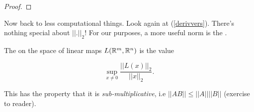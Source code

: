 \documentclass[11pt]{scrartcl}
\begin{document}
\begin{theorem}
\begin{proof}
\end{proof}
\end{theorem}

Now back to less computational things. Look again at (\ref{derivvers}). There's nothing special about $||.||_2$! For our purposes, a more useful norm is the .

\begin{definition}

The  on the space of linear maps $L(\mathbb R^m, \mathbb R^n)$ is the value

\begin{equation}
    \sup_{x \neq 0} \frac{||L(x)||_2}{||x||_2}.
\end{equation}
\end{definition}

This has the property that it is \emph{sub-multiplicative}, i.e $||AB|| \le ||A||||B||$ (exercise to reader).
\end{document}
